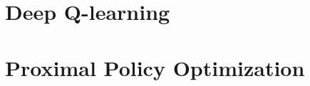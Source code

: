 \section{Deep Q-learning}\label{sec:agent-dqn}


\section{Proximal Policy Optimization}\label{sec:agent-ppo}
